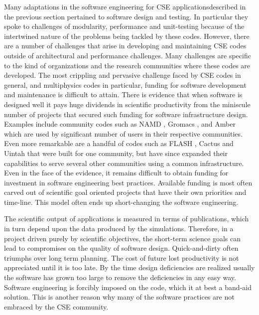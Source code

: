 
\label{sec:instChallenges}
Many adaptations in the software engineering for CSE applicationsdescribed in the previous
section pertained to software design and testing. In particular they
spoke to challenges of modularity, performance and unit-testing because of the
intertwined nature of the problems being tackled by these
codes. However, there are a number of challenges that arise in developing and maintaining CSE codes outside of architectural and performance challenges.  Many challenges are specific to the kind of organizations and the research communities
where these codes are developed. The most crippling and pervasive
challenge faced by CSE codes in general, and multiphysics codes in
particular, funding for software development and maintenance is difficult to attain. 
There is evidence that when software is designed well
it pays huge dividends in scientific productivity from the
miniscule number of projects that secured such funding for software
infrastructure design. Examples include community codes such as NAMD
\cite{}, Gromacs \cite{}, and Amber \cite{} which are used by
significant number of users in their respective communities. Even more
remarkable are a handful of codes such as FLASH \cite{Dubey2009},
Cactus \cite{} and Uintah \cite{} that were built for one community,
but have since expanded their capabilities to serve several other
communities using a common infrastructure.
Even in the face of the evidence, it remains difficult to obtain
funding for investment in software engineering best practices.
Available funding is most often carved out of scientific goal 
oriented projects that have their own priorities and time-line. This
model often ends up short-changing the software engineering.


The scientific output of applications is measured in terms of publications, which in
turn depend upon the data produced by the simulations. Therefore, in a
project driven purely by scientific objectives, the short-term science
goals can lead to compromises on the quality of software
design. Quick-and-dirty often triumphs over long term planning.   
The cost of future lost productivity is not appreciated until it is too
late. By the time design deficiencies are realized usually the
software has grown too large to remove the deficiencies in any easy
way.  Software engineering is forcibly imposed on the code, which it
at best a band-aid solution. This is another reason why many of the
software practices are not embraced by the CSE community. 

